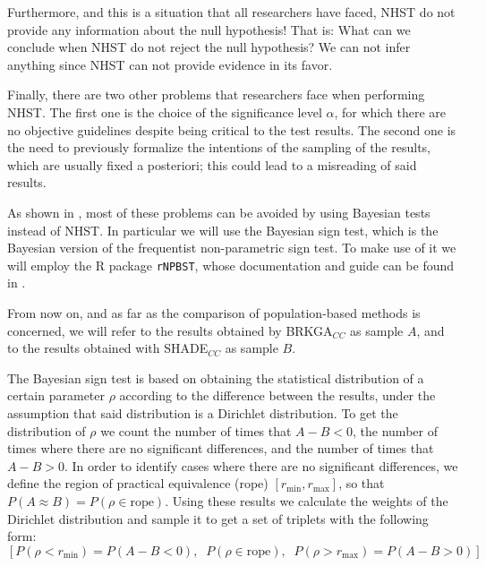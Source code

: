 \documentclass[review]{elsarticle}
\begin{document}
Furthermore, and this is a situation that all researchers have faced, NHST do not provide any information about the null hypothesis! That is: What can we conclude when NHST do not reject the null hypothesis? We can not infer anything since NHST can not provide evidence in its favor.

Finally, there are two other problems that researchers face when performing NHST. The first one is the choice of the significance level $\alpha$, for which there are no objective guidelines despite being critical to the test results. The second one is the need to previously formalize the intentions of the sampling of the results, which are usually fixed a posteriori; this could lead to a misreading of said results.

As shown in \cite{benavoli2017time}, most of these problems can be avoided by using Bayesian tests instead of NHST. In particular we will use the Bayesian sign test, which is the Bayesian version of the frequentist non-parametric sign test. To make use of it we will employ the R package \texttt{rNPBST}, whose documentation and guide can be found in \cite{carrasco2017rnpbst}.

From now on, and as far as the comparison of population-based methods is concerned, we will refer to the results obtained by BRKGA$_{CC}$ as sample $A$, and to the results obtained with SHADE$_{CC}$ as sample $B$.

The Bayesian sign test is based on obtaining the statistical distribution of a certain parameter $\rho$ according to the difference between the results, under the assumption that said distribution is a Dirichlet distribution. To get the distribution of $\rho$ we count the number of times that $A - B < 0$, the number of times where there are no significant differences, and the number of times that $A - B > 0$. In order to identify cases where there are no significant differences, we define the region of practical equivalence (rope) $[r_\text{min}, r_\text{max}]$, so that $P(A \approx B) = P(\rho \in \text{rope})$. Using these results we calculate the weights of the Dirichlet distribution and sample it to get a set of triplets with the following form: 
$$[P(\rho < r_\text{min}) = P(A - B < 0),\;\; P(\rho \in \text{rope}),\;\; P(\rho > r_\text{max}) = P(A - B > 0)]$$
\end{document}
